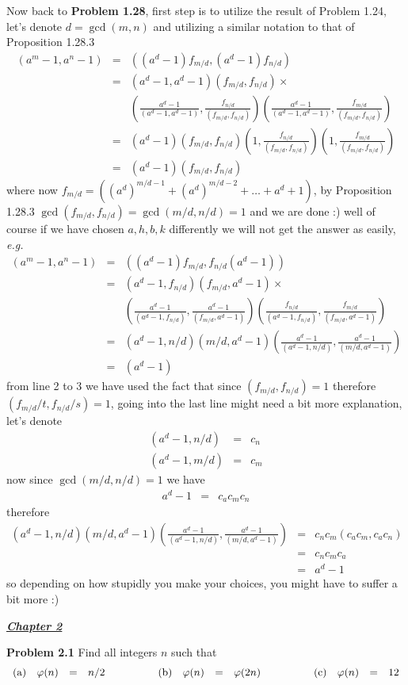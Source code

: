\documentclass[aps,preprint,preprintnumbers,nofootinbib,showpacs,prd]{revtex4-1}
\newcommand{\eg}{{\it e.g.} }
\newcommand{\nbea}{\begin{eqnarray*}}
\newcommand{\neea}{\end{eqnarray*}}
\begin{document}
Now back to {\bf Problem 1.28}, first step is to utilize the result of Problem 1.24, let's denote $d = \gcd(m,n)$ and utilizing a similar notation to that of Proposition 1.28.3
%
\nbea
(a^m-1,a^n-1) & = & ((a^d-1)f_{m/d},(a^d-1)f_{n/d}) \\
& = & (a^d-1,a^d-1)(f_{m/d},f_{n/d}) \times \\
&& \left ( \frac{a^d-1}{(a^d-1,a^d-1)},\frac{f_{n/d}}{(f_{m/d},f_{n/d})}\right )\left ( \frac{a^d-1}{(a^d-1,a^d-1)},\frac{f_{m/d}}{(f_{m/d},f_{n/d})}\right ) \\
& = & (a^d-1)(f_{m/d},f_{n/d}) \left ( 1, \frac{f_{n/d}}{(f_{m/d},f_{n/d})}\right )\left ( 1,\frac{f_{m/d}}{(f_{m/d},f_{n/d})}\right ) \\
& = & (a^d-1)(f_{m/d},f_{n/d})
\neea
%
where now $f_{m/d} = \left ( (a^d)^{m/d-1} + (a^d)^{m/d-2} + \ldots + a^d + 1 \right )$, by Proposition 1.28.3 $\gcd(f_{m/d},f_{n/d}) = \gcd(m/d,n/d)=1$ and we are done :) well of course if we have chosen $a,h,b,k$ differently we will not get the answer as easily, \eg 
%
\nbea
(a^m-1,a^n-1) & = & ((a^d-1)f_{m/d},f_{n/d}(a^d-1)) \\
& = & (a^d-1,f_{n/d})(f_{m/d},a^d-1) \times \\
&& \left ( \frac{a^d-1}{(a^d-1,f_{n/d})},\frac{a^d-1}{(f_{m/d},a^d-1)}\right )\left ( \frac{f_{n/d}}{(a^d-1,f_{n/d})},\frac{f_{m/d}}{(f_{m/d},a^d-1)}\right ) \\
& = & (a^d-1,n/d)(m/d,a^d-1) \left ( \frac{a^d-1}{(a^d-1,n/d)},\frac{a^d-1}{(m/d,a^d-1)}\right ) \\
& = & (a^d-1)
\neea
%
from line 2 to 3 we have used the fact that since $(f_{m/d},f_{n/d}) = 1$ therefore $(f_{m/d}/t,f_{n/d}/s) = 1$, going into the last line might need a bit more explanation, let's denote
%
\nbea
(a^d-1,n/d) & = & c_n \\
(a^d-1,m/d) & = & c_m
\neea
%
now since $\gcd(m/d,n/d)=1$ we have
%
\nbea
a^d - 1 & = & c_a c_m c_n
\neea
%
therefore
%
\nbea
(a^d-1,n/d)(m/d,a^d-1) \left ( \frac{a^d-1}{(a^d-1,n/d)},\frac{a^d-1}{(m/d,a^d-1)}\right ) & = & c_n c_m (c_a c_m, c_a c_n)\\
& = & c_n c_m c_a \\
& = & a^d - 1
\neea
%
so depending on how stupidly you make your choices, you might have to suffer a bit more :)

\bigskip
\underline{\textbf{\textit{Chapter 2}}}
\bigskip

{\bf Problem 2.1} Find all integers $n$ such that
%
\nbea
\begin{array}{l r c l c l r c l c l r c l}
{\rm(a)} & \varphi(n) & = & n/2 & ~~~~~~~~~ & {\rm(b)} & \varphi(n) & = & \varphi(2n) & ~~~~~~~~~ & {\rm(c)} & \varphi(n) & = & 12
\end{array}
\neea
%
\end{document}
